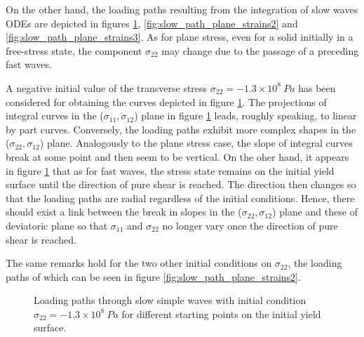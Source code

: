 On the other hand, the loading paths resulting from the integration of slow waves ODEs are depicted in figures \ref{fig:slow_path_plane_strains}, \ref{fig:slow_path_plane_strains2} and \ref{fig:slow_path_plane_strains3}.
As for plane stress, even for a solid initially in a free-stress state, the component $\sigma_{22}$ may change due to the passage of a preceding fast waves.

A negative initial value of the transverse stress $\sigma_{22}=-1.3 \times 10^{8} \: Pa$ has been considered for obtaining the curves depicted in figure \ref{fig:slow_path_plane_strains}.
The projections of integral curves in the ($\sigma_{11},\sigma_{12}$) plane in figure \ref{fig:slow_path_plane_strains} leads, roughly speaking, to linear by part curves.
Conversely, the loading paths exhibit more complex shapes in the ($\sigma_{22},\sigma_{12}$) plane.
Analogously to the plane stress case, the slope of integral curves break at some point and then seem to be vertical.
On the oher hand, it appears in figure \ref{fig:slow_path_plane_strains} that as for fast waves, the stress state remains on the initial yield surface until the direction of pure shear is reached.
The direction then changes so that the loading paths are radial regardless of the initial conditions.
Hence, there should exist a link between the break in slopes in the ($\sigma_{22},\sigma_{12}$) plane and these of deviatoric plane so that $\sigma_{11}$ and $\sigma_{22}$ no longer vary once the direction of pure shear is reached.

The same remarks hold for the two other initial conditions on $\sigma_{22}$, the loading paths of which can be seen in figure \ref{fig:slow_path_plane_strains2}.%
\begin{figure}[h!]
  \centering
  \caption{Loading paths through slow simple waves with initial condition $\sigma_{22}=-1.3\times 10^{8} \: Pa$ for different starting points on the initial yield surface.}
  \label{fig:slow_path_plane_strains}
\end{figure}

